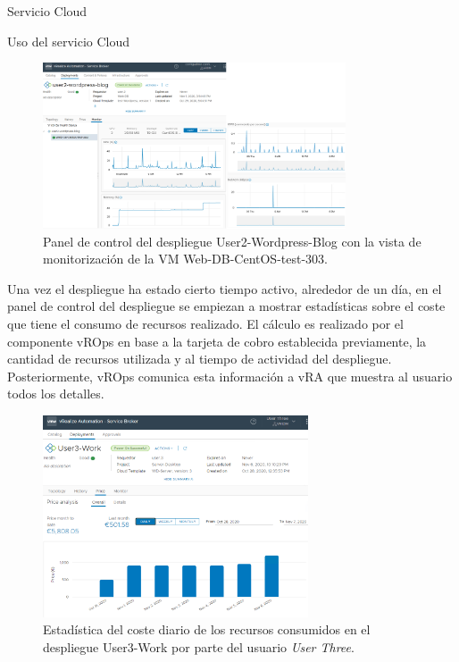\begin{subsection}{Servicio Cloud}
\begin{subsubsection}{Uso del servicio Cloud}
\begin{figure}[h]
            \centering
            \includegraphics[width=0.8\textwidth]{imaxes/pruebaconcepto/vrealize/statistics-service-broker.png}
            \caption{Panel de control del despliegue User2-Wordpress-Blog con la vista de monitorización de la VM Web-DB-CentOS-test-303.}
            \label{fig:statistics-user-2}
        \end{figure}
        \FloatBarrier
        Una vez el despliegue ha estado cierto tiempo activo, alrededor de un día, en el panel de control del despliegue se empiezan a mostrar estadísticas sobre el coste que tiene el consumo de recursos realizado. El cálculo es realizado por el componente vROps en base a la tarjeta de cobro establecida previamente, la cantidad de recursos utilizada y al tiempo de actividad del despliegue. Posteriormente, vROps comunica esta información a vRA que muestra al usuario todos los detalles.
        \begin{figure}[h]
            \centering
            \includegraphics[width=0.7\textwidth]{imaxes/pruebaconcepto/vrealize/price-user3-work.png}
            \caption{Estadística del coste diario de los recursos consumidos en el despliegue User3-Work por parte del usuario \textit{User Three}.}
            \label{fig:user3-daily-price}
        \end{figure}
        \FloatBarrier

\end{subsubsection}
\end{subsection}
